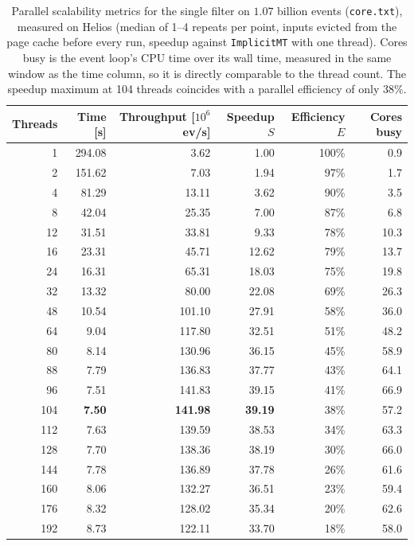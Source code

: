 \begin{table}[htbp]
\centering
\caption{Parallel scalability metrics for the single filter on $1.07$ billion events (\texttt{core.txt}), measured on Helios (median of 1--4 repeats per point, inputs evicted from the page cache before every run, speedup against \texttt{ImplicitMT} with one thread). Cores busy is the event loop's CPU time over its wall time, measured in the same window as the time column, so it is directly comparable to the thread count. The speedup maximum at 104 threads coincides with a parallel efficiency of only $38\%$.}
\label{tab:scalability-filter}
\begin{tabular}{rrrrrr}
\toprule
Threads & Time [s] & Throughput [$10^6$ ev/s] & Speedup $S$ & Efficiency $E$ & Cores busy \\
\midrule
 1 & 294.08 & 3.62 & 1.00 & 100\% & 0.9 \\
 2 & 151.62 & 7.03 & 1.94 & 97\% & 1.7 \\
 4 & 81.29 & 13.11 & 3.62 & 90\% & 3.5 \\
 8 & 42.04 & 25.35 & 7.00 & 87\% & 6.8 \\
12 & 31.51 & 33.81 & 9.33 & 78\% & 10.3 \\
16 & 23.31 & 45.71 & 12.62 & 79\% & 13.7 \\
24 & 16.31 & 65.31 & 18.03 & 75\% & 19.8 \\
32 & 13.32 & 80.00 & 22.08 & 69\% & 26.3 \\
48 & 10.54 & 101.10 & 27.91 & 58\% & 36.0 \\
64 & 9.04 & 117.80 & 32.51 & 51\% & 48.2 \\
80 & 8.14 & 130.96 & 36.15 & 45\% & 58.9 \\
88 & 7.79 & 136.83 & 37.77 & 43\% & 64.1 \\
96 & 7.51 & 141.83 & 39.15 & 41\% & 66.9 \\
104 & \textbf{7.50} & \textbf{141.98} & \textbf{39.19} & 38\% & 57.2 \\
112 & 7.63 & 139.59 & 38.53 & 34\% & 63.3 \\
128 & 7.70 & 138.36 & 38.19 & 30\% & 66.0 \\
144 & 7.78 & 136.89 & 37.78 & 26\% & 61.6 \\
160 & 8.06 & 132.27 & 36.51 & 23\% & 59.4 \\
176 & 8.32 & 128.02 & 35.34 & 20\% & 62.6 \\
192 & 8.73 & 122.11 & 33.70 & 18\% & 58.0 \\
\bottomrule
\end{tabular}
\end{table}
